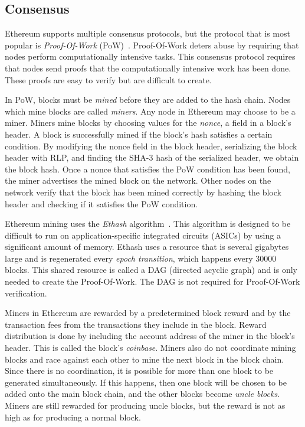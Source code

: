 \documentclass[12pt]{article}
\newcounter{protocol}
\begin{document}
\subsection{Consensus} \label{subsection:consensus}
Ethereum supports multiple consensus protocols, but the protocol that is most popular is \emph{Proof-Of-Work} (PoW)~\cite{bitcoin-whitepaper}. Proof-Of-Work deters abuse by requiring that nodes perform computationally intensive tasks. This consensus protocol requires that nodes send proofs that the computationally intensive work has been done. These proofs are easy to verify but are difficult to create.

In PoW, blocks must be \emph{mined} before they are added to the hash chain. Nodes which mine blocks are called \emph{miners}. Any node in Ethereum may choose to be a miner.
Miners mine blocks by choosing values for the \emph{nonce}, a field in a block's header. A block is successfully mined if the block's hash satisfies a certain condition. By modifying the nonce field in the block header, serializing the block header with RLP, and finding the SHA-3 hash of the serialized header, we obtain the block hash. Once a nonce that satisfies the PoW condition has been found, the miner advertises the mined block on the network. Other nodes on the network verify that the block has been mined correctly by hashing the block header and checking if it satisfies the PoW condition.

Ethereum mining uses the \emph{Ethash} algorithm~\cite{ethash}. This algorithm is designed to be difficult to run on application-specific integrated circuits (ASICs) by using a significant amount of memory. Ethash uses a resource that is several gigabytes large and is regenerated every \emph{epoch transition}, which happens every 30000 blocks. This shared resource is called a DAG (directed acyclic graph) and is only needed to create the Proof-Of-Work. The DAG is not required for Proof-Of-Work verification.

Miners in Ethereum are rewarded by a predetermined block reward and by the transaction fees from the transactions they include in the block. Reward distribution is done by including the account address of the miner in the block's header. This is called the block's \emph{coinbase}. Miners also do not coordinate mining blocks and race against each other to mine the next block in the block chain. Since there is no coordination, it is possible for more than one block to be generated simultaneously. If this happens, then one block will be chosen to be added onto the main block chain, and the other blocks become \emph{uncle blocks}. Miners are still rewarded for producing uncle blocks, but the reward is not as high as for producing a normal block.
\end{document}
